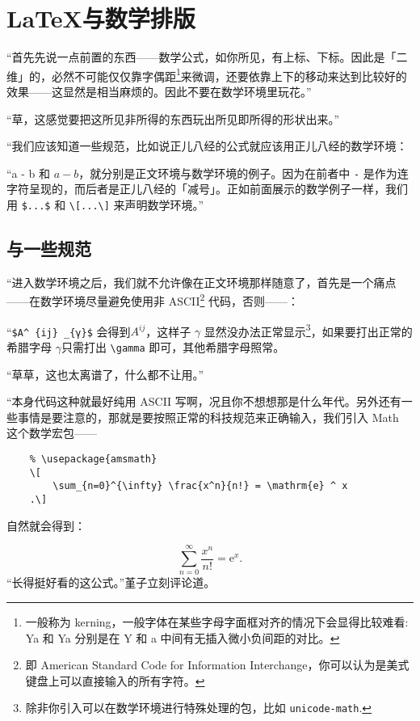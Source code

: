 \section{\LaTeX 与数学排版}

“首先先说一点前置的东西——数学公式，如你所见，有上标、下标。因此是「二维」的，必然不可能仅仅靠字偶距\footnote{一般称为 kerning，一般字体在某些字母字面框对齐的情况下会显得比较难看: {Y}{a} 和 Ya 分别是在 Y 和 a 中间有无插入微小负间距的对比。}来微调，还要依靠上下的移动来达到比较好的效果——这显然是相当麻烦的。因此不要在数学环境里玩花。”

“草，这感觉要把这所见非所得的东西玩出所见即所得的形状出来。”

“我们应该知道一些规范，比如说正儿八经的公式就应该用正儿八经的数学环境：

“a - b 和 $a - b$，就分别是正文环境与数学环境的例子。因为在前者中 \verb"-" 是作为连字符呈现的，而后者是正儿八经的「减号」。正如前面展示的数学例子一样，我们用 \verb"$...$" 和 \verb"\[...\]" 来声明数学环境。”

\subsection{\AmS 与一些规范}

“进入数学环境之后，我们就不允许像在正文环境那样随意了，首先是一个痛点——在数学环境尽量避免使用非 ASCII\footnote{即
    American Standard Code for Information Interchange，你可以认为是美式键盘上可以直接输入的所有字符。} 代码，否则——：

“\verb"$A^ {ij} _{γ}$" 会得到$
    A^{ij} %
$，这样子 $\gamma $ 显然没办法正常显示\footnote{除非你引入可以在数学环境进行特殊处理的包，比如 \texttt{unicode-math}.}，如果要打出正常的希腊字母 $\gamma $只需打出 \verb"\gamma" 即可，其他希腊字母照常。

“草草，这也太离谱了，什么都不让用。”

“本身代码这种就最好纯用 ASCII 写啊，况且你不想想那是什么年代。另外还有一些事情是要注意的，那就是要按照正常的科技规范来正确输入，我们引入 \AmS{}Math 这个数学宏包——


\begin{lstlisting}
    % \usepackage{amsmath}
    \[
        \sum_{n=0}^{\infty} \frac{x^n}{n!} = \mathrm{e} ^ x
    .\]
\end{lstlisting}

自然就会得到：



\[
    \sum_{n=0}^{\infty} \frac{x^n}{n!} = \mathrm{e} ^ x
    .\]
“长得挺好看的这公式。”堇子立刻评论道。


